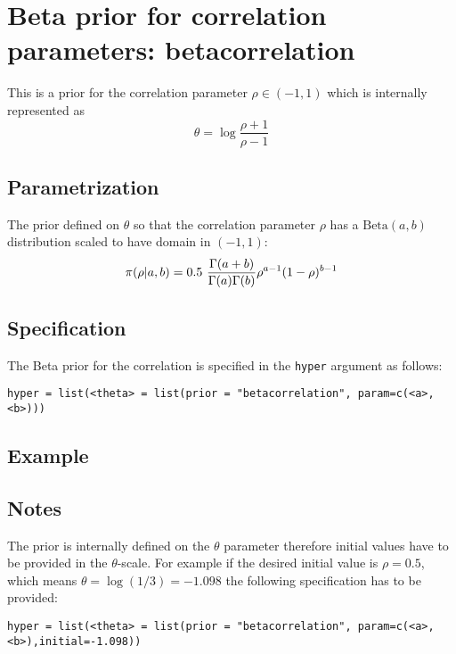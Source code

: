 \documentclass[a4paper,11pt]{article}
\begin{document}
\section*{Beta prior for correlation parameters: betacorrelation}

This is a prior for the correlation parameter $\rho\in(-1,1)$ which is
internally represented as
\[
\theta = \log\frac{\rho+1}{\rho-1}
\]

\subsection*{Parametrization}

The prior defined on $\theta$ so that the correlation parameter $\rho$
has a $\text{Beta}(a,b)$ distribution scaled to have domain in
$(-1,1)$:
\[
\pi(\rho|a,b) = 0.5\ {\Gamma(a+b) \over \Gamma(a) \Gamma(b)}
\rho^{a-1} (1-\rho)^{b-1} 
\]  


\subsection*{Specification}
The Beta prior for the correlation is specified in the {\tt hyper}
argument as follows:
\begin{center}
    {\tt hyper = list(<theta> = list(prior = "betacorrelation", param=c(<a>,<b>)))}
\end{center}

\subsection*{Example}

\subsection*{Notes}

The prior is internally defined on the $\theta$ parameter therefore
initial values have to be provided in the $\theta$-scale. For example
if the desired initial value is $\rho=0.5$, which means
$\theta=\log(1/3)=-1.098$ the following specification has to be
provided:
\begin{center}
    {\tt hyper = list(<theta> = list(prior = "betacorrelation", param=c(<a>,<b>),initial=-1.098))}
\end{center}
\end{document}
